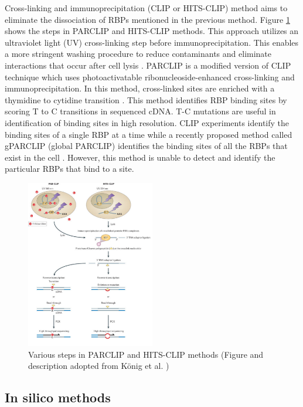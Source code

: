 Cross-linking and immunoprecipitation (CLIP or HITS-CLIP) method aims to eliminate the dissociation of RBPs mentioned in the previous method. Figure \ref{PARCLIP_HITSCLIP} shows the steps in PARCLIP and HITS-CLIP methods. This approach utilizes an ultraviolet light (UV) cross-linking step before immunoprecipitation. This enables a more stringent washing procedure to reduce contaminants and eliminate interactions that occur after cell lysis \cite{ule_05}. PARCLIP is a modified version of CLIP technique which uses photoactivatable ribonucleoside-enhanced cross-linking and immunoprecipitation. In this method, cross-linked sites are enriched with a thymidine to cytidine transition \cite{hafner_10}. This method identifies RBP binding sites by scoring T to C transitions in sequenced cDNA. T-C mutations are useful in identification of binding sites in high resolution. CLIP experiments identify the binding sites of a single RBP at a time while a recently proposed method called gPARCLIP (global PARCLIP) identifies the binding sites of all the RBPs that exist in the cell \cite{baltz_12}. However, this method is unable to detect and identify the particular RBPs that bind to a site.

\begin{figure}[H]
   \centering
   \includegraphics[width=0.5\textwidth,clip]{ch2_background/figures/parclip_hitsclip.pdf}

\caption[Various steps in PARCLIP and HITS-CLIP methods]{Various steps in PARCLIP and HITS-CLIP methods (Figure and description adopted from König et al. \cite{konig_2012})}
\label{PARCLIP_HITSCLIP}
\end{figure}

\subsection{In silico methods} 

